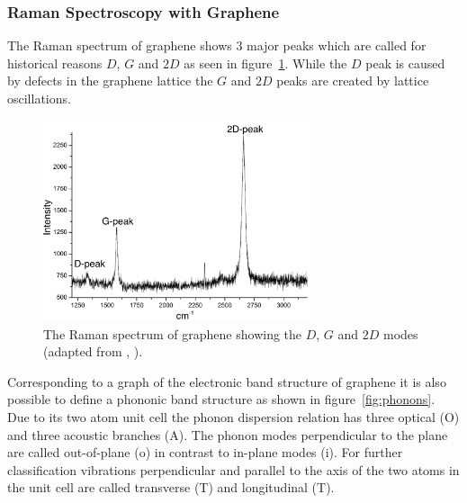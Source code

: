 \subsubsection{Raman Spectroscopy with Graphene}

The Raman spectrum of graphene shows 3 major peaks which are called for historical reasons $D$, $G$ and $2D$ as seen in figure~\ref{fig:dispersion}. While the $D$ peak is caused by defects in the graphene lattice the $G$ and $2D$ peaks are created by lattice oscillations.

\begin{figure}[!h]
  \centering
  \includegraphics[width=0.7\textwidth]{./images/graphene-raman.png}
  \caption{The Raman spectrum of graphene showing the $D$, $G$ and $2D$ modes (adapted from \mcite, ).}
  \label{fig:dispersion}
\end{figure}

Corresponding to a graph of the electronic band structure of graphene it is also possible to define a phononic band structure as shown in figure~\ref{fig:phonons}. Due to its two atom unit cell the phonon dispersion relation has three optical (O) and three acoustic branches (A). The phonon modes perpendicular to the plane are called out-of-plane (o) in contrast to in-plane modes (i). For further classification vibrations perpendicular and parallel to the axis of the two atoms in the unit cell are called transverse (T) and longitudinal (T).

